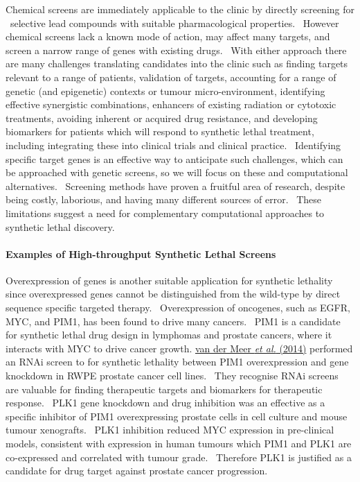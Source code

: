Chemical screens are immediately applicable to the clinic by directly screening for \ selective lead compounds with suitable pharmacological properties. \ However chemical screens lack a known mode of action, may affect many targets, and screen a narrow range of genes with existing drugs. \ With either approach there are many challenges translating candidates into the clinic such as finding targets relevant to a range of patients, validation of targets, accounting for a range of genetic (and epigenetic) contexts or tumour micro-environment, identifying effective synergistic combinations, enhancers of existing radiation or cytotoxic treatments, avoiding inherent or acquired drug resistance, and developing biomarkers for patients which will respond to synthetic lethal treatment, including integrating these into clinical trials and clinical practice. \ Identifying specific target genes is an effective way to anticipate such challenges, which can be approached with genetic screens, so we will focus on these and computational alternatives. \ Screening methods have proven a fruitful area of research, despite being costly, laborious, and having many different sources of error. \ These limitations suggest a need for complementary computational approaches to synthetic lethal discovery. \  

\paragraph[Examples of High{}-throughput Synthetic Lethal Screens]{Examples of High-throughput Synthetic Lethal Screens}

Overexpression of genes is another suitable application for synthetic lethality since overexpressed genes cannot be distinguished from the wild-type by direct sequence specific targeted therapy. \ Overexpression of oncogenes, such as EGFR, MYC, and PIM1, has been found to drive many cancers. \ PIM1 is a candidate for synthetic lethal drug design in lymphomas and prostate cancers, where it interacts with MYC to drive cancer growth. \hyperlink{ENREF103}{van der Meer}\hyperlink{ENREF103}{\textit{ et al.}}\hyperlink{ENREF103}{ (2014)} performed an RNAi screen to for synthetic lethality between PIM1 overexpression and gene knockdown in RWPE prostate cancer cell lines. \ They recognise RNAi screens are valuable for finding therapeutic targets and biomarkers for therapeutic response. \ PLK1 gene knockdown and drug inhibition was an effective as a specific inhibitor of PIM1 overexpressing prostate cells in cell culture and mouse tumour xenografts. \ PLK1 inhibition reduced MYC expression in pre-clinical models, consistent with expression in human tumours which PIM1 and PLK1 are co-expressed and correlated with tumour grade. \ Therefore PLK1 is justified as a candidate for drug target against prostate cancer progression. \  

